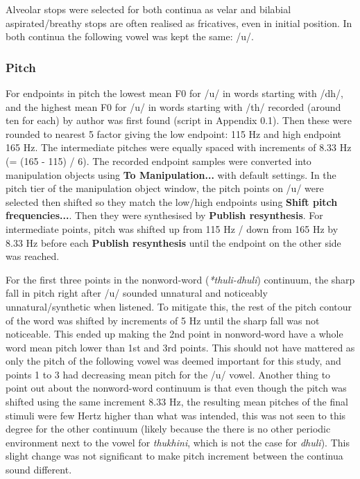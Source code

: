 \documentclass[12pt, english]{article}
\begin{document}
Alveolar stops were selected for both continua as velar and bilabial aspirated/breathy stops are often realised as fricatives, even in initial position. In both continua the following vowel was kept the same: /u/.

\subsubsection*{Pitch}
    For endpoints in pitch the lowest mean F0 for /u/ in words starting with /dh/, and the highest mean F0 for /u/ in words starting with /th/ recorded (around ten for each) by author was first found (script in Appendix 0.1). Then these were rounded to nearest 5 factor giving the low endpoint: 115 Hz and high endpoint 165 Hz. The intermediate pitches were equally spaced with increments of 8.33 Hz (= (165 - 115) / 6). The recorded endpoint samples were converted into manipulation objects using \textbf{To Manipulation...} with default settings. In the pitch tier of the manipulation object window, the pitch points on /u/ were selected then shifted so they match the low/high endpoints using \textbf{Shift pitch frequencies...}. Then they were synthesised by \textbf{Publish resynthesis}. For intermediate points, pitch was shifted up from 115 Hz / down from 165 Hz by 8.33 Hz before each \textbf{Publish resynthesis} until the endpoint on the other side was reached. \\ \par
    
    For the first three points in the nonword-word (\textit{*thuli-dhuli}) continuum, the sharp fall in pitch right after /u/ sounded unnatural and noticeably unnatural/synthetic when listened. To mitigate this, the rest of the pitch contour of the word was shifted by increments of 5 Hz until the sharp fall was not noticeable. This ended up making the 2nd point in nonword-word have a whole word mean pitch lower than 1st and 3rd points. This should not have mattered as only the pitch of the following vowel was deemed important for this study, and points 1 to 3 had decreasing mean pitch for the /u/ vowel. Another thing to point out about the nonword-word continuum is that even though the pitch was shifted using the same increment 8.33 Hz, the resulting mean pitches of the final stimuli were few Hertz higher than what was intended, this was not seen to this degree for the other continuum (likely because the there is no other periodic environment next to the vowel for \textit{thukhini}, which is not the case for \textit{dhuli}). This slight change was not significant to make pitch increment between the continua sound different. 
    
\end{document}
